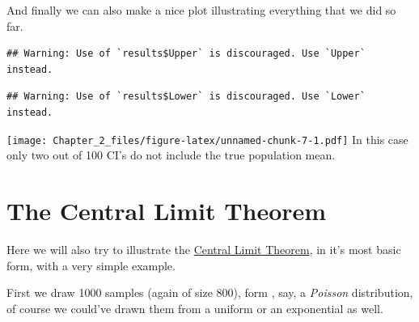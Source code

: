 \documentclass[
]{book}
\newenvironment{Shaded}{\begin{snugshade}}{\end{snugshade}}
\newcommand{\AttributeTok}[1]{\textcolor[rgb]{0.77,0.63,0.00}{#1}}
\newcommand{\DecValTok}[1]{\textcolor[rgb]{0.00,0.00,0.81}{#1}}
\newcommand{\FunctionTok}[1]{\textcolor[rgb]{0.00,0.00,0.00}{#1}}
\newcommand{\NormalTok}[1]{#1}
\newcommand{\OtherTok}[1]{\textcolor[rgb]{0.56,0.35,0.01}{#1}}
\newcommand{\SpecialCharTok}[1]{\textcolor[rgb]{0.00,0.00,0.00}{#1}}
\newcommand{\StringTok}[1]{\textcolor[rgb]{0.31,0.60,0.02}{#1}}
\begin{document}
And finally we can also make a nice plot illustrating everything that we did so far.

\begin{Shaded}
\end{Shaded}

\begin{verbatim}
## Warning: Use of `results$Upper` is discouraged. Use `Upper` instead.
\end{verbatim}

\begin{verbatim}
## Warning: Use of `results$Lower` is discouraged. Use `Lower` instead.
\end{verbatim}

\texttt{[image: Chapter\_2\_files/figure-latex/unnamed-chunk-7-1.pdf]}
In this case only two out of 100 CI's do not include the true population mean.

\hypertarget{the-central-limit-theorem}{%
\section{The Central Limit Theorem}\label{the-central-limit-theorem}}

Here we will also try to illustrate the \href{https://en.wikipedia.org/wiki/Central_limit_theorem}{Central Limit Theorem}, in it's most basic form, with a very simple example.

First we draw 1000 samples (again of size 800), form , say, a \emph{Poisson} distribution, of course we could've drawn them from a uniform or an exponential as well.
\end{document}
